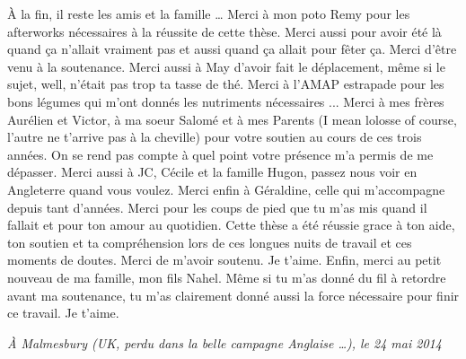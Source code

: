 \`A la fin, il reste les amis et la famille \ldots{}
Merci à mon poto Remy pour les afterworks nécessaires
à la réussite de cette thèse. Merci aussi pour avoir été
là quand ça n'allait vraiment pas et aussi quand ça
allait pour fêter ça. Merci d'être venu à la soutenance.
Merci aussi à May d'avoir fait le déplacement, même
si le sujet, well, n'était pas trop ta tasse de thé.
Merci à l'AMAP estrapade pour les bons légumes qui m'ont donnés
les nutriments nécessaires ...
Merci à mes frères Aurélien et Victor, à ma soeur Salomé et à mes
Parents (I mean lolosse of course, l'autre ne t'arrive pas
à la cheville) pour votre soutien au cours de ces trois années.
On se rend pas compte à quel point votre présence m'a permis de
me dépasser. Merci aussi à JC, Cécile et la famille Hugon, passez 
nous voir en Angleterre quand vous voulez. Merci enfin à Géraldine, celle qui 
m'accompagne depuis tant d'années. Merci pour les coups
de pied que tu m'as mis quand il fallait et pour ton
amour au quotidien. Cette thèse a été réussie grace à ton aide,
ton soutien et ta compréhension lors de ces longues nuits 
de travail et ces moments de doutes. Merci de m’avoir soutenu. Je t'aime.
Enfin, merci au petit nouveau de ma famille, mon fils Nahel.
Même si tu m'as donné du fil à retordre avant ma soutenance,
tu m'as clairement donné aussi la force nécessaire
pour finir ce travail. Je t'aime.

\begin{flushright}
\emph{\`A Malmesbury (UK, perdu dans la belle campagne Anglaise \ldots{}), le 24 mai 2014}
\end{flushright}
